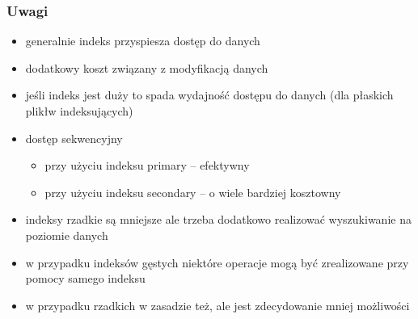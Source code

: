 \documentclass[12pt]{article}
\begin{document}
\subsubsection{Uwagi}
\begin{itemize}
\item generalnie indeks przyspiesza dostęp do danych
\item dodatkowy koszt związany z modyfikacją danych
\item jeśli indeks jest duży to spada wydajność dostępu do danych (dla płaskich plikłw indeksujących)
\item dostęp sekwencyjny
\begin{itemize}
\item przy użyciu indeksu primary -- efektywny
\item przy użyciu indeksu secondary -- o wiele bardziej kosztowny
\end{itemize}
\item indeksy rzadkie są mniejsze ale trzeba dodatkowo realizować wyszukiwanie na poziomie danych
\item w przypadku indeksów gęstych niektóre operacje mogą być zrealizowane przy pomocy samego indeksu
\item w przypadku rzadkich w zasadzie też, ale jest zdecydowanie mniej możliwości
\end{itemize}
\begin{comment}
		
Indeksy wielopoziomowe - B-drzewa
	* B- balanced - zrownowazone
	* Wezel
		K_1, P_1, K_2, P_2, ...., K_n, P_n
		- K - klucz
		- P - pointer
		- n - rozmiar
		- klucze sa uporzadkowane
		

B+ drzewa (wypelnienie wezlow)
  * Glebokosc B+ drzewa
    - K- liczba kluczy
    - Log_[n/2](K)
    - np. K = 1 000 000
          n = 100
          glebokosc = 4

  * B drzewa - najczestszy sposob organizacji
    - wydajny jesli chodzi o dostep "random"
    - wydany jesli chodzi o dostep sekwencyjny

Hash
  * Funkcja haszujaca
    - Key - > h(key)
  * Struktury typu hash
    - Statyczne
    - Dynamiczne (linear hashing, extensible hashing)
  * Podsumowanie
    - Struktury typu hash daja lepsze efekty jesli chodzi o dostep bezposredni
    - Problemy przy zapytaniach typu : zakres wartosci

SQL - indeksy

  CREATE INDEX <index-name> ON <relation-name> (<attribute-list>)

  CREATE INDEX b-index ON branch(branch-name)

  CREATE UNIQUE INDEX b-index ON branch(branch-name)

  DROP INDEX <index-name>

  FILL FACTOR <procent>

  FILL FACTOR 10%

\end{comment}
\end{document}
